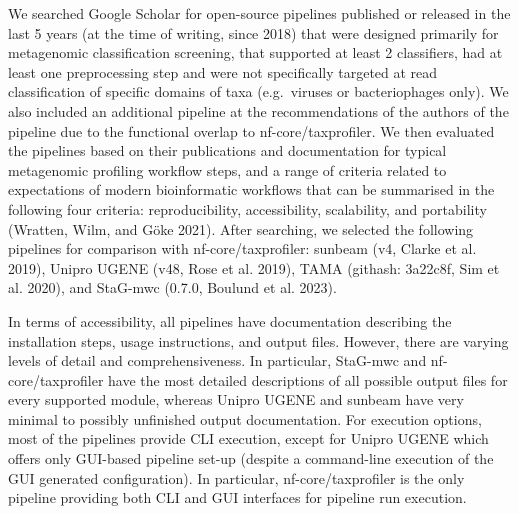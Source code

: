 \documentclass[
]{article}
\begin{document}
We searched Google Scholar for open-source pipelines published or
released in the last 5 years (at the time of writing, since 2018) that
were designed primarily for metagenomic classification screening, that
supported at least 2 classifiers, had at least one preprocessing step
and were not specifically targeted at read classification of specific
domains of taxa (e.g.~viruses or bacteriophages only). We also included
an additional pipeline at the recommendations of the authors of the
pipeline due to the functional overlap to nf-core/taxprofiler. We then
evaluated the pipelines based on their publications and documentation
for typical metagenomic profiling workflow steps, and a range of
criteria related to expectations of modern bioinformatic workflows that
can be summarised in the following four criteria: reproducibility,
accessibility, scalability, and portability (Wratten, Wilm, and Göke
2021). After searching, we selected the following pipelines for
comparison with nf-core/taxprofiler: sunbeam (v4, Clarke et al. 2019),
Unipro UGENE (v48, Rose et al. 2019), TAMA (githash: 3a22c8f, Sim et al.
2020), and StaG-mwc (0.7.0, Boulund et al. 2023).

In terms of accessibility, all pipelines have documentation describing
the installation steps, usage instructions, and output files. However,
there are varying levels of detail and comprehensiveness. In particular,
StaG-mwc and nf-core/taxprofiler have the most detailed descriptions of
all possible output files for every supported module, whereas Unipro
UGENE and sunbeam have very minimal to possibly unfinished output
documentation. For execution options, most of the pipelines provide CLI
execution, except for Unipro UGENE which offers only GUI-based pipeline
set-up (despite a command-line execution of the GUI generated
configuration). In particular, nf-core/taxprofiler is the only pipeline
providing both CLI and GUI interfaces for pipeline run execution.
\end{document}
